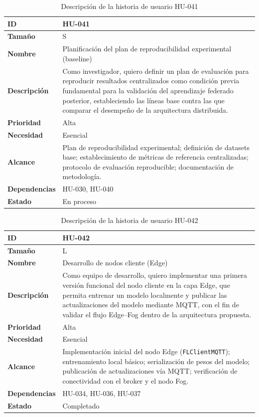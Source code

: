 \documentclass{report}
\begin{document}
\begin{table}[H]
\centering
\caption{Descripción de la historia de usuario HU-041}
\label{tab:hu041}
\begin{tabular}{|l|p{12cm}|}
\hline
\textbf{ID} & HU-041 \\ \hline
\textbf{Tamaño} & S \\ \hline
\textbf{Nombre} & Planificación del plan de reproducibilidad experimental (baseline) \\ \hline
\textbf{Descripción} &
Como investigador, quiero definir un plan de evaluación para reproducir resultados centralizados como condición previa fundamental para la validación del aprendizaje federado posterior, estableciendo las líneas base contra las que comparar el desempeño de la arquitectura distribuida. \\ \hline
\textbf{Prioridad} & Alta \\ \hline
\textbf{Necesidad} & Esencial \\ \hline
\textbf{Alcance} &
Plan de reproducibilidad experimental; definición de datasets base; establecimiento de métricas de referencia centralizadas; protocolo de evaluación reproducible; documentación de metodología. \\ \hline
\textbf{Dependencias} & HU-030, HU-040 \\ \hline
\textbf{Estado} & En proceso \\ \hline
\end{tabular}
\end{table}



\begin{table}[H]
\centering
\caption{Descripción de la historia de usuario HU-042}
\label{tab:hu042}
\begin{tabular}{|l|p{12cm}|}
\hline
\textbf{ID} & HU-042 \\ \hline
\textbf{Tamaño} & L \\ \hline
\textbf{Nombre} & Desarrollo de nodos cliente (Edge) \\ \hline
\textbf{Descripción} &
Como equipo de desarrollo, quiero implementar una primera versión funcional del nodo cliente en la capa Edge, que permita entrenar un modelo localmente y publicar las actualizaciones del modelo mediante MQTT, con el fin de validar el flujo Edge--Fog dentro de la arquitectura propuesta. \\ \hline
\textbf{Prioridad} & Alta \\ \hline
\textbf{Necesidad} & Esencial \\ \hline
\textbf{Alcance} &
Implementación inicial del nodo Edge (\texttt{FLClientMQTT}); entrenamiento local básico; serialización de pesos del modelo; publicación de actualizaciones vía MQTT; verificación de conectividad con el broker y el nodo Fog. \\ \hline
\textbf{Dependencias} & HU-034, HU-036, HU-037 \\ \hline
\textbf{Estado} & Completado \\ \hline
\end{tabular}
\end{table}
\end{document}
